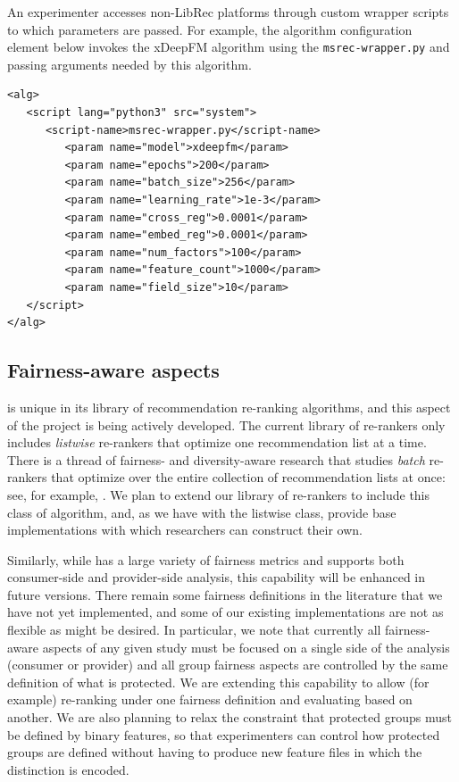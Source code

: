 An experimenter accesses non-LibRec platforms through custom wrapper scripts to which parameters are passed. For example, the algorithm configuration element below invokes the xDeepFM algorithm using the \texttt{msrec-wrapper.py} and passing arguments needed by this algorithm.

{\small
\begin{verbatim}
<alg>
   <script lang="python3" src="system">
      <script-name>msrec-wrapper.py</script-name>
         <param name="model">xdeepfm</param>
         <param name="epochs">200</param>
         <param name="batch_size">256</param>
         <param name="learning_rate">1e-3</param>
         <param name="cross_reg">0.0001</param>
         <param name="embed_reg">0.0001</param>
         <param name="num_factors">100</param>
         <param name="feature_count">1000</param>
         <param name="field_size">10</param>
   </script>
</alg>
\end{verbatim}}

\subsection{Fairness-aware aspects}
\libauto{} is unique in its library of recommendation re-ranking algorithms, and this aspect of the project is being actively developed. The current library of re-rankers only includes \textit{listwise} re-rankers that optimize one recommendation list at a time. There is a thread of fairness- and diversity-aware research that studies \textit{batch} re-rankers that optimize over the entire collection of recommendation lists at once: see, for example, \cite{surer2018multistakeholder,patro2020fairrec,mansoury2020fairmatch}. We plan to extend our library of re-rankers to include this class of algorithm, and, as we have with the listwise class, provide base implementations with which researchers can construct their own.

Similarly, while \libauto{} has a large variety of fairness metrics and supports both consumer-side and provider-side analysis, this capability will be enhanced in future versions. There remain some fairness definitions in the literature that we have not yet implemented, and some of our existing implementations are not as flexible as might be desired. In particular, we note that currently all fairness-aware aspects of any given study must be focused on a single side of the analysis (consumer or provider) and all group fairness aspects are controlled by the same definition of what is protected. We are extending this capability to allow (for example) re-ranking under one fairness definition and evaluating based on another. We are also planning to relax the constraint that protected groups must be defined by binary features, so that experimenters can control how protected groups are defined without having to produce new feature files in which the distinction is encoded. 


